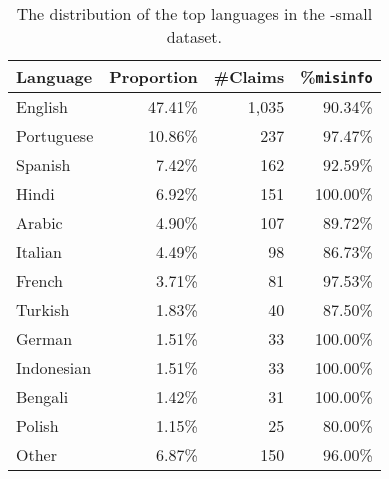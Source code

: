 \documentclass[sigconf,natbib=true,anonymous=false,nonacm]{acmart}
\begin{document}
\begin{table}[H]
    \caption{The distribution of the top languages in the \datasetname-small
    dataset.}
    \begin{center}
        \begin{tabular}{lrrr}
            \toprule
            \textbf{Language} &
            \textbf{Proportion} &
            \textbf{\#Claims} &
            \textbf{\%\texttt{misinfo}} \\

            \midrule

            English & 47.41\% & 1,035 & 90.34\% \\
            Portuguese & 10.86\% & 237 & 97.47\% \\
            Spanish & 7.42\% & 162 & 92.59\% \\
            Hindi & 6.92\% & 151 & 100.00\% \\
            Arabic & 4.90\% & 107 & 89.72\% \\
            Italian & 4.49\% & 98 & 86.73\% \\
            French & 3.71\% & 81 & 97.53\% \\
            Turkish & 1.83\% & 40 & 87.50\% \\
            German & 1.51\% & 33 & 100.00\% \\
            Indonesian & 1.51\% & 33 & 100.00\% \\
            Bengali & 1.42\% & 31 & 100.00\% \\
            Polish & 1.15\% & 25 & 80.00\% \\
            Other & 6.87\% & 150 & 96.00\% \\
            \bottomrule
        \end{tabular}
        \label{tab:muminsmallstats}
    \end{center}
\end{table}
\end{document}
